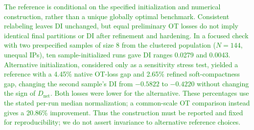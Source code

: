 \textcolor{green}{The reference is conditional on the specified initialization
and numerical construction, rather than a unique globally optimal benchmark.
Consistent relabeling leaves DI unchanged, but equal preliminary OT losses do
not imply identical final partitions or DI after refinement and hardening.
In a focused check with two prespecified samples of size 8 from the clustered
population ($N=144$, unequal IPs), ten sample-initialized runs gave DI ranges
0.0279 and 0.0043. Alternative initialization, considered only as a sensitivity
stress test, yielded a reference with a 4.45\% native OT-loss gap and 2.65\%
refined soft-compactness gap, changing the second sample's DI from $-0.5822$
to $-0.4220$ without changing the sign of $D_{\mathrm{net}}$. Both losses were
lower for the alternative. These percentages use the stated per-run median
normalization; a common-scale OT comparison instead gives a 20.86\% improvement.
Thus the construction must be reported and fixed for reproducibility; we do
not assert invariance to alternative reference choices.}
